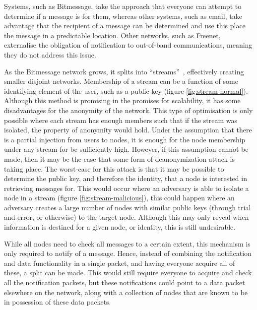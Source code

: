 			Systems, such as Bitmessage, take the approach that everyone can attempt to determine if a message is for them, whereas other systems, such as email, take advantage that the recipient of a message can be determined and use this place the message in a predictable location. Other networks, such as Freenet, externalise  the obligation of notification to out-of-band communications, meaning they do not address this issue.
			
			As the Bitmessage network grows, it splits into ``streams''~\cite{bitmsg}, effectively creating smaller disjoint networks. Membership of a stream can be a function of some identifying element of the user, such as a public key (figure \ref{fig:stream-normal}). Although this method is promising in the promises for scalability, it has some disadvantages for the anonymity of the network. This type of optimisation is only possible where each stream has enough members such that if the stream was isolated, the property of anonymity would hold. Under the assumption that there is a partial injection from users to nodes, it is enough for the node membership under any stream for be sufficiently high. However, if this assumption cannot be made, then it may be the case that some form of deanonymization attack is taking place. The worst-case for this attack is that it may be possible to determine the public key, and therefore the identity, that a node is interested in retrieving messages for. This would occur where an adversary is able to isolate a node in a stream (figure \ref{fig:stream-malicious}), this could happen where an adversary creates a large number of nodes with similar public keys (through trial and error, or otherwise) to the target node. Although this may only reveal when information is destined for a given node, or identity, this is still undesirable.
			
			
			
			
			While all nodes need to check all messages to a certain extent, this mechanism is only required to notify of a message. Hence, instead of combining the notification and data functionality in a single packet, and having everyone acquire all of these, a split can be made. This would still require everyone to acquire and check all the notification packets, but these notifications could point to a data packet elsewhere on the network, along with a collection of nodes that are known to be in possession of these data packets.
			

